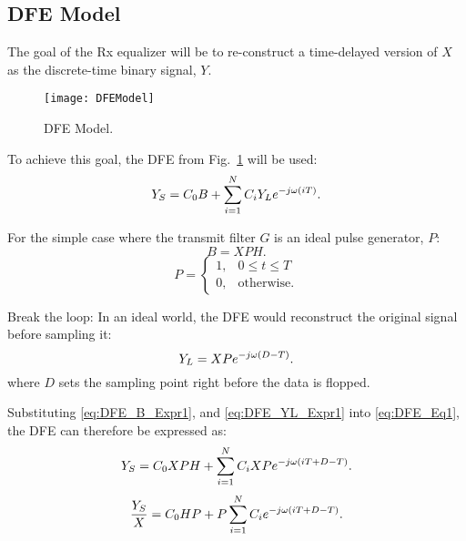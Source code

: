 \subsection{DFE Model}
\par The goal of the Rx equalizer will be to re-construct a time-delayed version of $X$ as the discrete-time binary signal, $Y$.
\begin{figure}[!ht]
	\centering
	\texttt{[image: DFEModel]}
	\caption{DFE Model.}
\label{fig:DFEModel}%
\end{figure}
%
\par To achieve this goal, the DFE from Fig.~\ref{fig:DFEModel} will be used:
\begin{equation}
	Y_S=C_0 B + \sum\limits_{i=1}^{N}{C_i Y_L e^{-j\w(iT)}}.
\label{eq:DFE_Eq1}%
\end{equation}
%
\par For the simple case where the transmit filter $G$ is an ideal pulse generator, $P$:
\begin{equation}
	B=XPH
	\mathrm{.}
\label{eq:DFE_B_Expr1}%
\end{equation}
%
\begin{equation}
	P=
\begin{cases}
	1\mathrm{,} & 0\leq t \leq T
\\
	0\mathrm{,} & \textrm{otherwise.}
\end{cases}
\end{equation}
%
\par Break the loop: In an ideal world, the DFE would reconstruct the original signal before sampling it:
\begin{equation}
	Y_L = XP e^{-j\w (D-T)}
	\mathrm{.}
\label{eq:DFE_YL_Expr1}%
\end{equation}
where $D$ sets the sampling point right before the data is flopped.
%
\par Substituting \eqref{eq:DFE_B_Expr1}, and \eqref{eq:DFE_YL_Expr1} into \eqref{eq:DFE_Eq1}, the DFE can therefore be expressed as:
\begin{equation}
	Y_S=C_0 XPH + \sum\limits_{i=1}^{N}{C_i XP e^{-j\omega(iT+D-T)}}.
\end{equation}
%
\begin{equation}
	\frac{Y_S}{X}=C_0 HP + P\sum\limits_{i=1}^{N}{C_i e^{-j\omega(iT+D-T)}}.
\end{equation}
%
